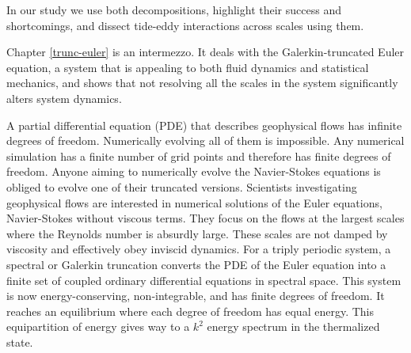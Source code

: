 \documentclass[../Rajarshi-thesis-draft.tex]{subfiles}
\begin{document}
In our study we use both decompositions, highlight their success and shortcomings, and dissect tide-eddy interactions across scales using them.





Chapter \ref{trunc-euler} is an intermezzo. It deals with the Galerkin-truncated Euler equation, a system that is appealing to both fluid dynamics and statistical mechanics, and shows that not resolving all the scales in the system significantly alters system dynamics.

A partial differential equation (PDE) that describes geophysical flows has infinite degrees of freedom. Numerically evolving all of them is impossible. Any numerical simulation has a finite number of grid points and therefore has finite degrees of freedom. Anyone aiming to numerically evolve the Navier-Stokes equations is obliged to evolve one of their truncated versions. Scientists investigating geophysical flows are interested in numerical solutions of the Euler equations, Navier-Stokes without viscous terms. They focus on the flows at the largest scales where the Reynolds number is absurdly large. These scales are not damped by viscosity and effectively obey inviscid dynamics. For a triply periodic system, a spectral or Galerkin truncation converts the PDE of the Euler equation into a finite set of coupled ordinary differential equations in spectral space. This system is now energy-conserving, non-integrable, and has finite degrees of freedom. It reaches an equilibrium where each degree of freedom has equal energy. This equipartition of energy gives way to a $k^2$ energy spectrum in the thermalized state. 
\end{document}
